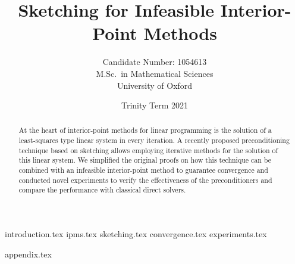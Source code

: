 \documentclass[a4paper, 12pt, egregdoesnotlikesansseriftitles, notitlepage, abstract, final]{scrreprt}
\title{Sketching for Infeasible Interior-Point Methods}
\author{Candidate Number: 1054613 \\ M.Sc.\ in Mathematical Sciences \\ University of Oxford}
\date{Trinity Term 2021}
\newcommand{\wordcount}{}
\begin{document}
\maketitle

\thispagestyle{empty}

\begin{abstract}
    At the heart of interior-point methods for linear programming is the solution of a least-squares type linear system in every iteration.
    A recently proposed preconditioning technique based on sketching allows employing iterative methods for the solution of this linear system.
    We simplified the original proofs on how this technique can be combined with an infeasible interior-point method to guarantee convergence and conducted novel experiments to verify the effectiveness of the preconditioners and compare the performance with classical direct solvers.
\end{abstract}

\vfill
\begin{center}
    \wordcount{}
\end{center}

\tableofcontents

{introduction.tex}
{ipms.tex}
{sketching.tex}
{convergence.tex}
{experiments.tex}

\printbibliography[heading=bibintoc]

\appendix
{appendix.tex}
\end{document}
